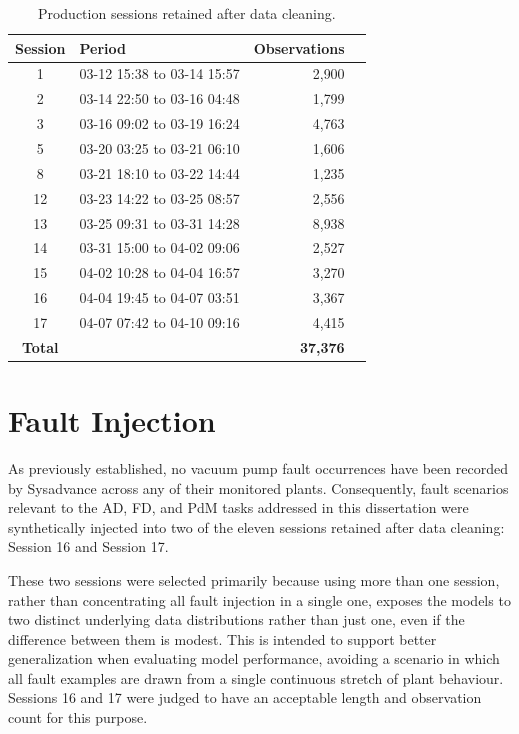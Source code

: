 \begin{table}[htbp]
\centering
\caption{Production sessions retained after data cleaning.}
\label{tab:cleaning_sessions}
\small
\begin{tabular}{clrr}
\hline
\textbf{Session} & \textbf{Period} & \textbf{Observations} \\
\hline
1  & 03-12 15:38 to 03-14 15:57 & 2{,}900 \\
2  & 03-14 22:50 to 03-16 04:48 & 1{,}799 \\
3  & 03-16 09:02 to 03-19 16:24 & 4{,}763 \\
5  & 03-20 03:25 to 03-21 06:10 & 1{,}606 \\
8  & 03-21 18:10 to 03-22 14:44 & 1{,}235 \\
12 & 03-23 14:22 to 03-25 08:57 & 2{,}556 \\
13 & 03-25 09:31 to 03-31 14:28 & 8{,}938 \\
14 & 03-31 15:00 to 04-02 09:06 & 2{,}527 \\
15 & 04-02 10:28 to 04-04 16:57 & 3{,}270 \\
16 & 04-04 19:45 to 04-07 03:51 & 3{,}367 \\
17 & 04-07 07:42 to 04-10 09:16 & 4{,}415 \\
\hline
\textbf{Total} & & \textbf{37{,}376} \\
\hline
\end{tabular}
\end{table}

\section{Fault Injection} \label{sec:fault_scenarios}

As previously established, no vacuum pump fault occurrences have been recorded 
by Sysadvance across any of their monitored plants. Consequently, fault scenarios relevant to the AD, FD, 
and PdM tasks addressed in this dissertation were synthetically injected into two of the eleven 
sessions retained after data cleaning: Session 16 and Session 17.

These two sessions were selected primarily because using more than one session, rather than concentrating 
all fault injection in a single one, exposes the models to two distinct underlying data 
distributions rather than just one, even if the difference between them is modest. This is intended to 
support better generalization when evaluating model performance, avoiding a scenario in which all fault 
examples are drawn from a single continuous stretch of plant behaviour. Sessions 16 and 17 were judged to 
have an acceptable length and observation count for this purpose.

